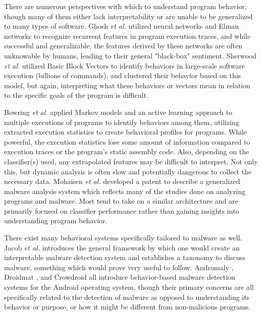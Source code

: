 There are numerous perspectives with which to understand program behavior, though many of them either lack interpretability or are unable to be generalized to many types of software. Ghosh \textit{et al.} \cite{ghosh_behavior_1999} utilized neural networks and Elman networks to recognize recurrent features in program execution traces, and while successful and generalizable, the features derived by these networks are often unknowable by humans, leading to their general "black-box" sentiment. Sherwood \textit{et al.} \cite{Sherwood_large_2002} utilized Basic Block Vectors to identify behaviors in large-scale software execution (billions of commands), and clustered their behavior based on this model, but again, interpreting what these behaviors or vectors mean in relation to the specific goals of the program is difficult. 

Bowring \textit{et al.} \cite{Bowring_active_2004} applied Markov models and an active learning approach to multiple executions of programs to identify behaviors among them, utilizing extracted execution statistics to create behavioral profiles for programs. While powerful, the execution statistics lose some amount of information compared to execution traces or the program's static assembly code. Also, depending on the classifier(s) used, any extrapolated features may be difficult to interpret. Not only this, but dynamic analysis is often slow and potentially dangerous to collect the necessary data. Mohaisen \textit{et al.} \cite{Mohaisen_systems_2014} developed a patent to describe a generalized malware analysis system which reflects many of the studies done on analyzing programs and malware. Most tend to take on a similar architecture and are primarily focused on classifier performance rather than gaining insights into understanding program behavior.

There exist many behavioral systems specifically tailored to malware as well. Jacob \textit{et al.} \cite{jacob2008behavioral} introduces the general framework by which one would create an interpretable malware detection system and establishes a taxonomy to discuss malware, something which would prove very useful to follow. Andromaly \cite{shabtai2012andromaly}, Droidmat \cite{wu2012droidmat}, and Crowdroid \cite{burguera2011crowdroid} all introduce behavior-based malware detection systems for the Android operating system, though their primary concerns are all specifically related to the detection of malware as opposed to understanding its behavior or purpose, or how it might be different from non-malicious programs.